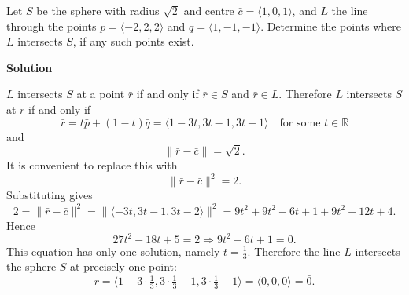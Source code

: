\begin{examplebox}
Let $S$ be the sphere with radius $\sqrt{2}$ and centre $\bar{c} = \langle 1, 0, 1 \rangle$, and $L$ the line through the points $\bar{p} = \langle -2, 2, 2 \rangle$ and $\bar{q} = \langle 1, -1, -1 \rangle$. Determine the points where $L$ intersects $S$, if any such points exist.
\vspace{1em}

\textbf{Solution}
\vspace{1em}

$L$ intersects $S$ at a point $\bar{r}$ if and only if $\bar{r} \in S$ and $\bar{r} \in L$. Therefore $L$ intersects $S$ at $\bar{r}$ if and only if
\[
\bar{r} = t\bar{p} + (1 - t)\bar{q} = \langle 1 - 3t, 3t - 1, 3t - 1 \rangle \quad \text{for some } t \in \mathbb{R}
\]
and
\[
\|\bar{r} - \bar{c}\| = \sqrt{2}.
\]
It is convenient to replace this with
\[
\|\bar{r} - \bar{c}\|^2 = 2.
\]
Substituting gives
\[
2 = \| \bar{r} - \bar{c} \|^2 = \| \langle -3t, 3t - 1, 3t - 2 \rangle \|^2 = 9t^2 + 9t^2 - 6t + 1 + 9t^2 - 12t + 4.
\]
Hence
\[
27t^2 - 18t + 5 = 2 \Rightarrow 9t^2 - 6t + 1 = 0.
\]
This equation has only one solution, namely $t = \frac{1}{3}$. Therefore the line $L$ intersects the sphere $S$ at precisely one point:
\[
\bar{r} = \langle 1 - 3 \cdot \tfrac{1}{3}, 3 \cdot \tfrac{1}{3} - 1, 3 \cdot \tfrac{1}{3} - 1 \rangle = \langle 0, 0, 0 \rangle = \bar{0}.
\]
\end{examplebox}
